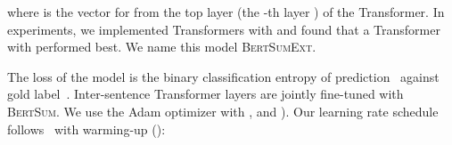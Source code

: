 \documentclass[11pt,a4paper]{article}
\makeatletter
\newcommand{\thickhline}{\noalign {\ifnum 0=`}\fi \hrule height 1pt
    \futurelet \reserved@a \@xhline
}
\makeatother
\begin{document}
    where  is the vector for  from the top layer (the
    -th layer ) of the Transformer. In experiments, we implemented
    Transformers with  and found that a Transformer with
     performed best.
    We name this model \textsc{BertSumExt}.
    
The loss of the model is the binary classification entropy of
    prediction~ against gold label~.  Inter-sentence
    Transformer layers are jointly fine-tuned with \textsc{BertSum}.
    We use the Adam optimizer with , and
    ). Our learning rate schedule
    follows~\cite{vaswani2017attention} with warming-up ():
    
    
    
    
    \begin{table*}[!htbp]
        

\end{table*}
\end{document}
